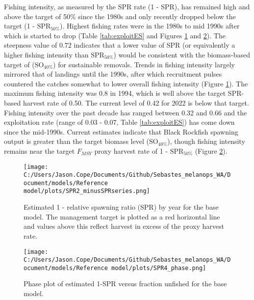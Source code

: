 \documentclass[11pt,
  letterpaper,
]{article}
\begin{document}
Fishing intensity, as measured by the SPR rate (1 - SPR), has remained high and above the target of 50\% since the 1980s and only recently dropped below the target (1 - \(\text{SPR}_{50\%}\)). Highest fishing rates were in the 1980s to mid 1990s after which is started to drop (Table \ref{tab:exploitES} and Figures \ref{fig:es-1-spr} and \ref{fig:es-phase}). The steepness value of 0.72 indicates that a lower value of SPR (or equivalently a higher fishing intensity than \(\text{SPR}_{50\%}\)) would be consistent with the biomass-based target of (\(\text{SO}_{40\%}\)) for sustainable removals. Trends in fishing intensity largely mirrored that of landings until the 1990s, after which recruitment pulses countered the catches somewhat to lower overall fishing intensity (Figure \ref{fig:es-1-spr}). The maximum fishing intensity was 0.8 in 1994, which is well above the target SPR-based harvest rate of 0.50. The current level of 0.42 for 2022 is below that target. Fishing intensity over the past decade has ranged between 0.32 and 0.66 and the exploitation rate (range of 0.03 - 0.07, Table \ref{tab:exploitES}) has come down since the mid-1990s. Current estimates indicate that Black Rockfish spawning output is greater than the target biomass level (\(\text{SO}_{40\%}\)), though fishing intensity remains near the target \(F_{MSY}\) proxy harvest rate of 1 - \(\text{SPR}_{50\%}\) (Figure \ref{fig:es-phase}).



\begin{figure}
{\centering
\texttt{[image: C:/Users/Jason.Cope/Documents/Github/Sebastes\_melanops\_WA/Document/models/Reference model/plots/SPR2\_minusSPRseries.png]}
}
\caption{Estimated 1 - relative spawning ratio (SPR) by year for the base model. The management target is plotted as a red horizontal line and values above this reflect harvest in excess of the proxy harvest rate.\label{fig:es-1-spr}}
\end{figure}

\begin{figure}
{\centering
\texttt{[image: C:/Users/Jason.Cope/Documents/Github/Sebastes\_melanops\_WA/Document/models/Reference model/plots/SPR4\_phase.png]}
}
\caption{Phase plot of estimated 1-SPR versus fraction unfished for the base model.\label{fig:es-phase}}
\end{figure}

\clearpage
\end{document}
